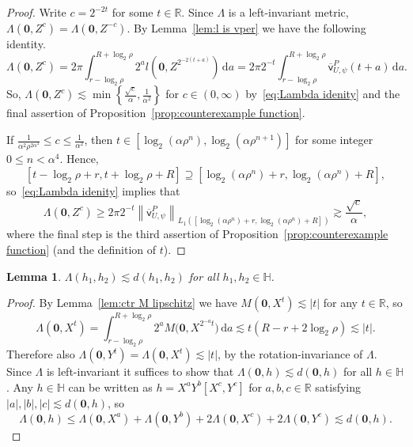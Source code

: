 \documentclass[11pt,reqno]{amsart}
\renewcommand{\H}{\mathbb{H}}
\newcommand{\R}{\mathbb{R}}
\newcommand{\ud}[0]{\,\mathrm{d}}
\newcommand{\0}{\mathbf{0}}
\renewcommand{\1}{\mathbf 1}
\renewcommand{\supset}{\supseteq}
\renewcommand{\ge}{\geqslant}
\renewcommand{\le}{\leqslant}
\newtheorem{lemma}[thm]{Lemma}
\theoremstyle{remark}
\newcommand{\vpP}[1]{{\overline{\mathsf{v}}^{P}_{\!#1}}}
\begin{document}
  \begin{proof} Write $c=2^{-2t}$ for some $t\in \R$. Since $\Lambda$ is a left-invariant metric, $\Lambda(\0,Z^c)=\Lambda(\0,Z^{-c})$.
    By Lemma~\ref{lem:l is vper} we have the following identity.
\begin{equation}\label{eq:Lambda idenity}
  \Lambda(\0,Z^c)=2\pi \int_{r-\log_2\rho}^{R+\log_2\rho} 2^{a} l\left(\0,Z^{2^{-2(t+a)}}\right)\ud a=2\pi 2^{-t} \int_{r-\log_2\rho}^{R+\log_2\rho} \vpP{U,\psi}(t+a)\ud a.
  \end{equation}
So, $\Lambda(\0,Z^c)\lesssim \min\left\{\frac{\sqrt{c}}{\alpha},\frac{1}{\alpha^2}\right\}$ for  $c\in (0,\infty)$ by~\eqref{eq:Lambda idenity} and  the final assertion of Proposition~\ref{prop:counterexample function}.

  If $\frac{1}{\alpha^{2}\rho^{2\alpha^4}}\le c\le \frac{1}{\alpha^{2}}$, then  $t\in [\log_2(\alpha\rho^n),\log_2(\alpha\rho^{n+1})]$ for some  integer $0\le n< \alpha^4$. Hence, $$[t-\log_2\rho+r,t+\log_2\rho+R]\supset [\log_2(\alpha\rho^n)+r,\log_2(\alpha \rho^n)+R],$$ so~\eqref{eq:Lambda idenity} implies  that
  $$
  \Lambda(\0,Z^c)\ge 2\pi 2^{-t} \left\|\vpP{U,\psi}\right\|_{L_1([\log_2(\alpha\rho^{n})+r,\log_2(\alpha\rho^{n})+R])}\gtrsim \frac{\sqrt{c}}{\alpha},
  $$
  where the final step is the third assertion of Proposition~\ref{prop:counterexample function} (and the definition of $t$).
  \end{proof}

  \begin{lemma}\label{lem:Lambda is Lipschitz} $\Lambda(h_1,h_2)\lesssim d(h_1,h_2)$ for all $h_1,h_2\in \H$.
  \end{lemma}

  \begin{proof}
    By Lemma~\ref{lem:ctr M lipschitz} we have $M(\0,X^t)\lesssim |t|$ for any $t\in \R$, so
    \begin{equation*}
      \Lambda(\0,X^t)=\int_{r-\log_2\rho}^{R+\log_2\rho} 2^a M\big(\0,X^{2^{-a}t}\big)\ud a\lesssim t (R-r+2\log_2\rho)\lesssim |t|.
    \end{equation*}
    Therefore also $\Lambda(\0,Y^t)=\Lambda(\0,X^t)\lesssim |t|$, by the rotation-invariance of $\Lambda$.  Since $\Lambda$ is left-invariant it suffices to show that $\Lambda(\0,h)\lesssim d(\0,h)$ for all $h\in \H$. Any $h\in \H$ can be written as $h=X^aY^b[X^c,Y^c]$ for  $a,b,c\in \R$ satisfying $|a|,|b|,|c|\lesssim d(\0,h)$, so
    \begin{equation*}
      \Lambda(\0,h)\le \Lambda(\0,X^a) + \Lambda(\0,Y^b) + 2 \Lambda(\0,X^c) + 2 \Lambda(\0,Y^c)\lesssim d(\0,h).\tag*{\qedhere}
    \end{equation*}
  \end{proof}
\end{document}
